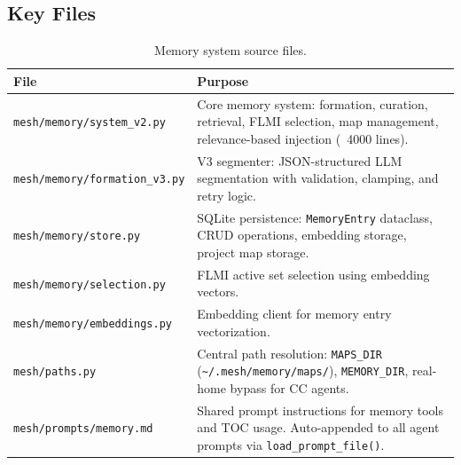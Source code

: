 \documentclass[11pt,a4paper]{article}
\newcommand{\code}[1]{\texttt{#1}}
\begin{document}
\subsection{Key Files}

\begin{table}[h]
\centering
\small
\begin{tabular}{@{}lL{7cm}@{}}
\toprule
\textbf{File} & \textbf{Purpose} \\
\midrule
\code{mesh/memory/system\_v2.py}
  & Core memory system: formation, curation, retrieval, FLMI selection,
    map management, relevance-based injection (~4000 lines). \\
\code{mesh/memory/formation\_v3.py}
  & V3 segmenter: JSON-structured LLM segmentation with validation,
    clamping, and retry logic. \\
\code{mesh/memory/store.py}
  & SQLite persistence: \code{MemoryEntry} dataclass, CRUD operations,
    embedding storage, project map storage. \\
\code{mesh/memory/selection.py}
  & FLMI active set selection using embedding vectors. \\
\code{mesh/memory/embeddings.py}
  & Embedding client for memory entry vectorization. \\
\code{mesh/paths.py}
  & Central path resolution: \code{MAPS\_DIR}
    (\code{\textasciitilde/.mesh/memory/maps/}), \code{MEMORY\_DIR},
    real-home bypass for CC agents. \\
\code{mesh/prompts/memory.md}
  & Shared prompt instructions for memory tools and TOC usage.
    Auto-appended to all agent prompts via \code{load\_prompt\_file()}. \\
\bottomrule
\end{tabular}
\caption{Memory system source files.}
\label{tab:memory-files}
\end{table}
\end{document}
